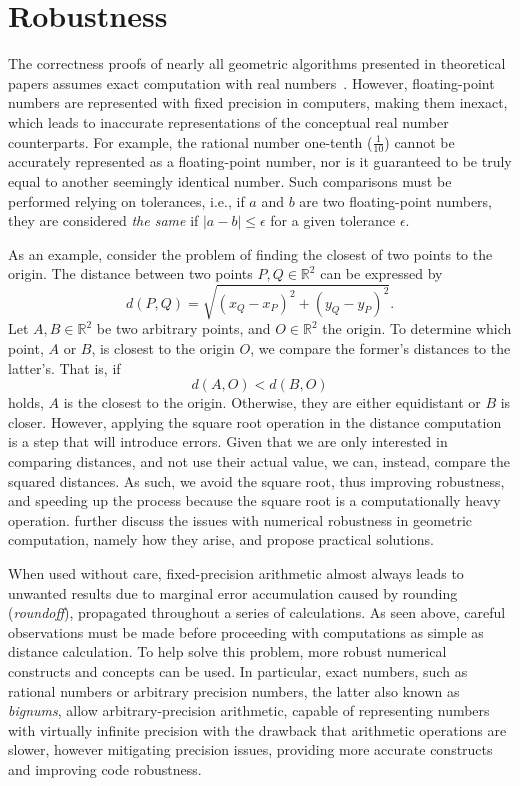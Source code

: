 \section{Robustness}%
\label{sec:related.robustness}

The correctness proofs of nearly all geometric algorithms presented in
theoretical papers assumes exact computation with real
numbers~\cite{CGAL:4.13:23LGK}.  However, floating-point numbers are represented
with fixed precision in computers, making them inexact, which leads to
inaccurate representations of the conceptual real number counterparts.  For
example, the rational number one-tenth ($\frac{1}{10}$) cannot be accurately
represented as a floating-point number, nor is it guaranteed to be truly equal
to another seemingly identical number.  Such comparisons must be performed
relying on tolerances, i.e., if $a$ and $b$ are two floating-point numbers, they
are considered \textit{the same} if $|a - b| \le \epsilon$ for a given tolerance
$\epsilon$.

As an example, consider the problem of finding the closest of two points
to the origin.  The distance between two points $P,Q \in \mathbb{R}^2$ can be
expressed by
%
\[ 
  d(P, Q) = \sqrt{(x_Q - x_P)^2 + (y_Q - y_P)^2}.
\]
%
Let $A,B \in \mathbb{R}^2$ be two arbitrary points, and $O \in \mathbb{R}^2$ the
origin.  To determine which point, $A$ or $B$, is closest to the origin $O$, we
compare the former's distances to the latter's.  That is, if
%
\[ 
  d(A, O) < d(B, O) 
\]
%
holds, $A$ is the closest to the origin.  Otherwise, they are either equidistant
or $B$ is closer.  However, applying the square root operation in the distance
computation is a step that will introduce errors.  Given that we are only
interested in comparing distances, and not use their actual value, we can,
instead, compare the squared distances.  As such, we avoid the square root, thus
improving robustness, and speeding up the process because the square root is a
computationally heavy operation.   further discuss the
issues with numerical robustness in geometric computation, namely how they
arise, and propose practical solutions.

When used without care, fixed-precision arithmetic almost always leads to
unwanted results due to marginal error accumulation caused by rounding
(\textit{roundoff}), propagated throughout a series of calculations.  As seen
above, careful observations must be made before proceeding with computations as
simple as distance calculation.  To help solve this problem, more robust
numerical constructs and concepts can be used.  In particular, exact numbers,
such as rational numbers or arbitrary precision numbers, the latter also known
as \textit{bignums}, allow arbitrary-precision arithmetic, capable of
representing numbers with virtually infinite precision with the drawback that
arithmetic operations are slower, however mitigating precision issues, providing
more accurate constructs and improving code robustness.

